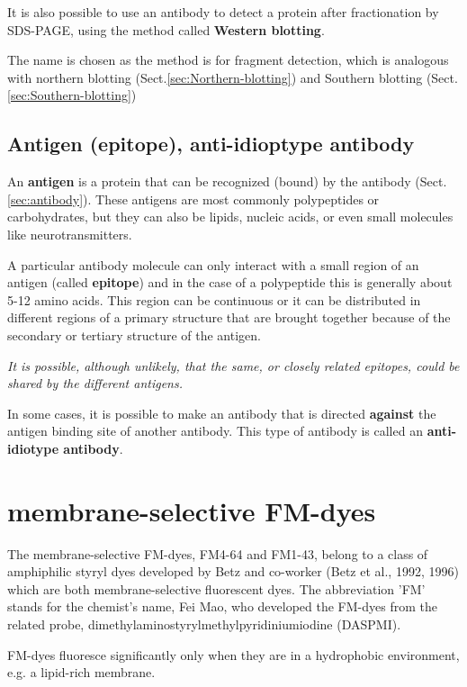 It is also possible to use an antibody to detect a protein after fractionation
by SDS-PAGE, using the method called {\bf Western blotting}.

The name is chosen as the method is for fragment detection, which is analogous
with northern blotting (Sect.\ref{sec:Northern-blotting}) and Southern blotting
(Sect.\ref{sec:Southern-blotting})


\subsection{Antigen (epitope), anti-idioptype antibody}
\label{sec:antigen}
\label{sec:epitope}

An {\bf antigen} is a  protein that can be recognized (bound) by the antibody
(Sect.\ref{sec:antibody}). These antigens are most commonly polypeptides or
carbohydrates, but they can also be lipids, nucleic acids, or even small
molecules like neurotransmitters. 

A particular antibody molecule can only interact with a small region of an
antigen (called {\bf epitope}) and in the case of a polypeptide this is
generally about 5-12 amino acids. This region can be continuous or it can be
distributed in different regions of a primary structure that are brought
together because of the secondary or tertiary structure of the antigen.

{\it It is possible, although unlikely, that the same, or closely related
epitopes, could be shared by the different antigens.}

In some cases, it is possible to make an antibody that is directed {\bf against}
the antigen binding site of another antibody. This type of antibody is called an
{\bf anti-idiotype antibody}.

\section{ membrane-selective FM-dyes}
\label{sec:FM-dyes-membrane-selective}

The membrane-selective FM-dyes, FM4-64 and FM1-43, belong to a class of
amphiphilic styryl dyes developed by Betz and co-worker (Betz et al., 1992,
1996) which are both membrane-selective fluorescent dyes. The abbreviation 'FM'
stands for the chemist's name, Fei Mao, who developed the FM-dyes from the
related probe, dimethylaminostyrylmethylpyridiniumiodine (DASPMI).
 
FM-dyes fluoresce significantly only when they are in a hydrophobic
environment, e.g. a lipid-rich membrane.


